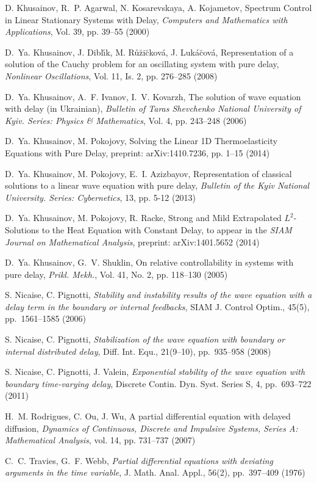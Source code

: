 \documentclass[12pt]{article}
\numberwithin{equation}{section}
\numberwithin{equation}{section}
\begin{document}
\begin{thebibliography}{1}
	{\sc D. Khusainov, R.~P. Agarwal, N. Kosarevskaya, A. Kojametov},
	Spectrum Control in Linear Stationary Systems with Delay,
	{\em Computers and Mathematics with Applications}, Vol. 39, pp. 39--55 (2000)
	    
	{\sc D.~Ya. Khusainov, J. Dibl\'{\i}k, M. R\r{u}\u{z}i\u{c}kov\'{a}, J. Luk\'{a}\u{c}ov\'{a}},
	Representation of a solution of the Cauchy problem for an oscillating system with pure delay,
	{\em Nonlinear Oscillations}, Vol. 11, Is. 2, pp. 276--285 (2008)
	
	{\sc D.~Ya. Khusainov, A.~F. Ivanov, I.~V. Kovarzh}, 
	The solution of wave equation with delay (in Ukrainian),
	{\em Bulletin of Taras Shevchenko National University of Kyiv. Series: Physics \& Mathematics}, Vol. 4, pp. 243--248 (2006)
	
	{\sc D.~Ya. Khusainov, M. Pokojovy},
	Solving the Linear 1D Thermoelasticity Equations with Pure Delay,
	preprint: arXiv:1410.7236, pp. 1--15 (2014)

	{\sc D.~Ya. Khusainov, M. Pokojovy, E.~I. Azizbayov}, 
	Representation of classical solutions to a linear wave equation with pure delay,
	{\em Bulletin of the Kyiv National University. Series: Cybernetics}, 13, pp. 5-12 (2013)

	{\sc D.~Ya. Khusainov, M. Pokojovy, R. Racke},
	Strong and Mild Extrapolated $L^{2}$-Solutions to the Heat Equation with Constant Delay,
	to appear in the {\em SIAM Journal on Mathematical Analysis}, preprint: arXiv:1401.5652 (2014)

	{\sc D.~Ya. Khusainov, G.~V. Shuklin},
	On relative controllability in systems with pure delay,
	{\em Prikl. Mekh.}, Vol. 41, No. 2, pp. 118--130 (2005)

	{\sc S. Nicaise, C. Pignotti},
	{\em Stability and instability results of the wave equation with a delay term in the boundary or internal feedbacks},
	SIAM J. Control Optim., 45(5), pp.~1561--1585
	(2006)
	
	{\sc S. Nicaise, C. Pignotti},
	{\em Stabilization of the wave equation with boundary or internal distributed delay},
	Diff. Int. Equ., 21(9--10), pp.~935--958
	(2008)
	
	{\sc S. Nicaise, C. Pignotti, J. Valein},
	{\em Exponential stability of the wave equation with boundary time-varying delay},
	Discrete Contin. Dyn. Syst. Series S, 4, pp.~693--722
	(2011)

	{\sc H.~M. Rodrigues, C. Ou, J. Wu},
	A partial differential equation with delayed diffusion,
	{\it Dynamics of Continuous, Discrete and Impulsive Systems, Series A: Mathematical Analysis},
	vol. 14, pp. 731--737 (2007)

	{\sc C.~C. Travies, G.~F. Webb},
	{\em Partial differential equations with deviating arguments in the time variable},
	J. Math. Anal. Appl., 56(2), pp.~397--409
	(1976)
\end{thebibliography}
\end{document}
